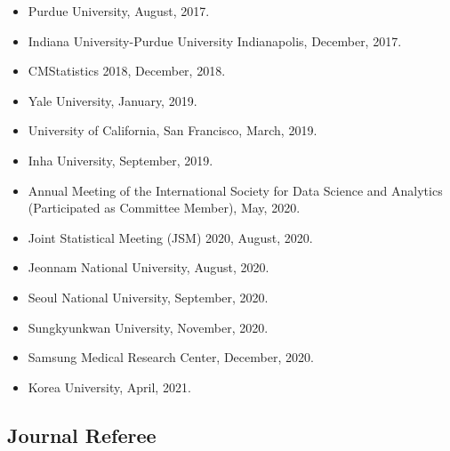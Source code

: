 \documentclass[
]{book}
\begin{document}
\begin{itemize}
\item
  Purdue University, August, 2017.
\item
  Indiana University-Purdue University Indianapolis, December, 2017.
\item
  CMStatistics 2018, December, 2018.
\item
  Yale University, January, 2019.
\item
  University of California, San Francisco, March, 2019.
\item
  Inha University, September, 2019.
\item
  Annual Meeting of the International Society for Data Science and Analytics (Participated as Committee Member), May, 2020.
\item
  Joint Statistical Meeting (JSM) 2020, August, 2020.
\item
  Jeonnam National University, August, 2020.
\item
  Seoul National University, September, 2020.
\item
  Sungkyunkwan University, November, 2020.
\item
  Samsung Medical Research Center, December, 2020.
\item
  Korea University, April, 2021.
\end{itemize}

\hypertarget{journal-referee}{%
\subsection*{Journal Referee}\label{journal-referee}}
\end{document}
